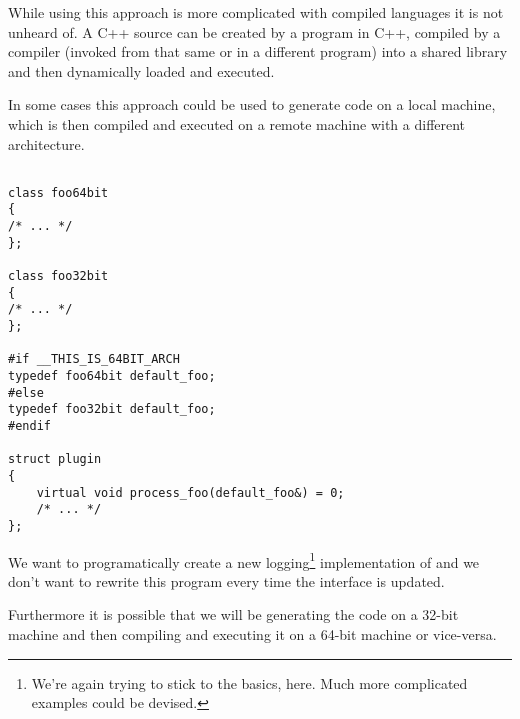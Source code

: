 While using this approach is more complicated with compiled languages it is not
unheard of. A C++ source can be created by a program in C++, compiled by a compiler
(invoked from that same or in a different program) into a shared library and then
dynamically loaded and executed.

In some cases this approach could be used to generate code on a local machine,
which is then compiled and executed on a remote machine with a different architecture.

\begin{verbatim}

class foo64bit
{
/* ... */
};

class foo32bit
{
/* ... */
};

#if __THIS_IS_64BIT_ARCH
typedef foo64bit default_foo;
#else
typedef foo32bit default_foo;
#endif

struct plugin
{
	virtual void process_foo(default_foo&) = 0;
	/* ... */
};

\end{verbatim}

We want to programatically create a new logging\footnote{
We're again trying to stick to the basics, here. Much more complicated
examples could be devised.
} implementation of \verb@plugin@
and we don't want to rewrite this program every time
the interface is updated.

Furthermore it is possible that we will be generating the code
on a 32-bit machine and then compiling and executing it on a 64-bit machine
or vice-versa.

